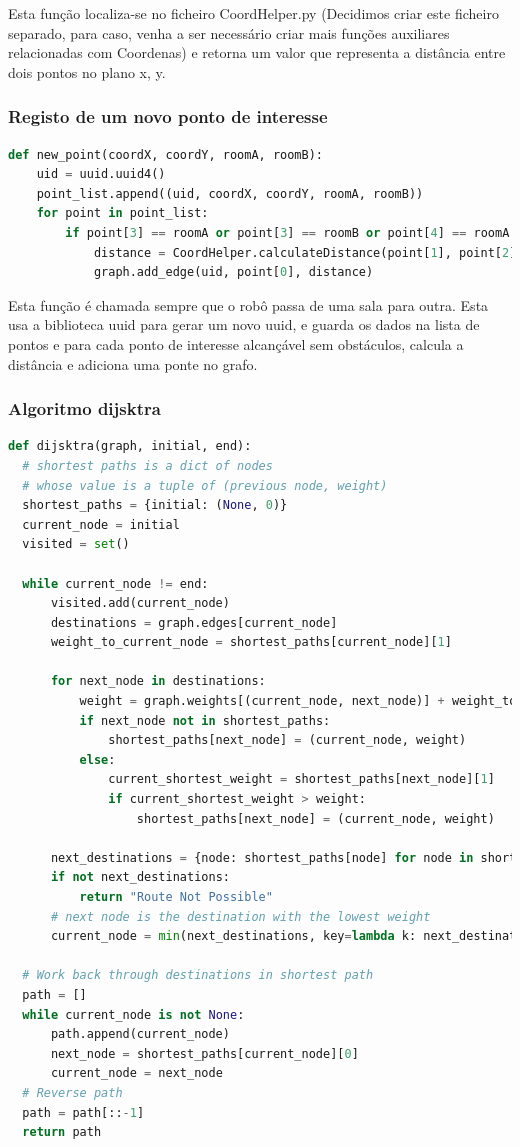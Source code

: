 \documentclass{article}
\begin{document}
Esta função localiza-se no ficheiro CoordHelper.py (Decidimos criar este ficheiro separado, para caso, venha a ser necessário criar mais funções auxiliares relacionadas com Coordenas) e retorna um valor que representa a distância entre dois pontos no plano x, y.

\subsubsection{Registo de um novo ponto de interesse}
\begin{lstlisting}[language=Python]
  def new_point(coordX, coordY, roomA, roomB):
	uid = uuid.uuid4()
	point_list.append((uid, coordX, coordY, roomA, roomB))
	for point in point_list:
		if point[3] == roomA or point[3] == roomB or point[4] == roomA or point[4] == roomB:
			distance = CoordHelper.calculateDistance(point[1], point[2], coordX, coordY)
			graph.add_edge(uid, point[0], distance)
\end{lstlisting}

Esta função é chamada sempre que o robô passa de uma sala para outra. Esta usa a biblioteca uuid para gerar um novo uuid, e guarda os dados na lista de pontos e para cada ponto de interesse alcançável sem obstáculos, calcula a distância e adiciona uma ponte no grafo.

\subsubsection{Algoritmo dijsktra}
\begin{lstlisting}[language=Python]
  def dijsktra(graph, initial, end):
  # shortest paths is a dict of nodes
  # whose value is a tuple of (previous node, weight)
  shortest_paths = {initial: (None, 0)}
  current_node = initial
  visited = set()
  
  while current_node != end:
      visited.add(current_node)
      destinations = graph.edges[current_node]
      weight_to_current_node = shortest_paths[current_node][1]

      for next_node in destinations:
          weight = graph.weights[(current_node, next_node)] + weight_to_current_node
          if next_node not in shortest_paths:
              shortest_paths[next_node] = (current_node, weight)
          else:
              current_shortest_weight = shortest_paths[next_node][1]
              if current_shortest_weight > weight:
                  shortest_paths[next_node] = (current_node, weight)
      
      next_destinations = {node: shortest_paths[node] for node in shortest_paths if node not in visited}
      if not next_destinations:
          return "Route Not Possible"
      # next node is the destination with the lowest weight
      current_node = min(next_destinations, key=lambda k: next_destinations[k][1])
  
  # Work back through destinations in shortest path
  path = []
  while current_node is not None:
      path.append(current_node)
      next_node = shortest_paths[current_node][0]
      current_node = next_node
  # Reverse path
  path = path[::-1]
  return path
\end{lstlisting}
\end{document}
